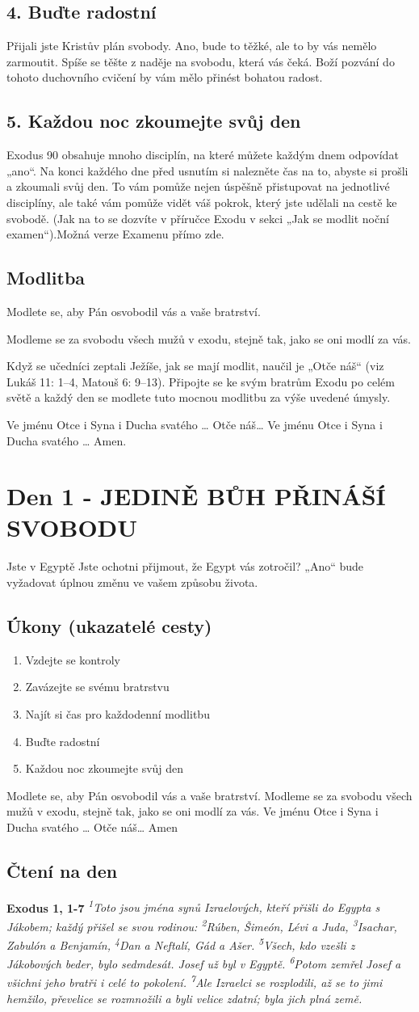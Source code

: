 \documentclass[11pt]{article}
\newcommand{\zacatekPrvniTyden}{
  Jste v Egyptě \newline
  Jste ochotni přijmout, že Egypt vás zotročil? „Ano“ bude vyžadovat úplnou změnu ve vašem způsobu života.

\subsection*{Úkony (ukazatelé cesty)}
\begin{enumerate}
  \item Vzdejte se kontroly
  \item Zavázejte se svému bratrstvu
  \item Najít si čas pro každodenní modlitbu
  \item Buďte radostní
  \item Každou noc zkoumejte svůj den
\end{enumerate}
Modlete se, aby Pán osvobodil vás a vaše bratrství. \newline
Modleme se za svobodu všech mužů v exodu, stejně tak, jako se oni modlí za vás.\newline
Ve jménu Otce i Syna i Ducha svatého …  Otče náš… Amen
}
\begin{document}
\subsection*{4. Buďte radostní}
Přijali jste Kristův plán svobody. Ano, bude to těžké, ale to by vás nemělo zarmoutit. Spíše se těšte z naděje na svobodu, která vás čeká. Boží pozvání do tohoto duchovního cvičení by vám mělo přinést bohatou radost.

\subsection*{5. Každou noc zkoumejte svůj den}
Exodus 90 obsahuje mnoho disciplín, na které můžete každým dnem odpovídat „ano“. Na konci každého dne před usnutím si nalezněte čas na to, abyste si prošli a zkoumali svůj den. To vám pomůže nejen úspěšně přistupovat na jednotlivé disciplíny, ale také vám pomůže vidět váš pokrok, který jste udělali na cestě ke svobodě. (Jak na to se dozvíte v příručce Exodu v sekci „Jak se modlit noční examen“).Možná verze Examenu přímo zde.

\subsection*{Modlitba}
Modlete se, aby Pán osvobodil vás a vaše bratrství.

Modleme se za svobodu všech mužů v exodu, stejně tak, jako se oni modlí za vás.

Když se učedníci zeptali Ježíše, jak se mají modlit, naučil je „Otče náš“ (viz Lukáš 11: 1–4, Matouš 6: 9–13). Připojte se ke svým bratrům Exodu po celém světě a každý den se modlete tuto mocnou modlitbu za výše uvedené úmysly.

Ve jménu Otce i Syna i Ducha svatého …  Otče náš… Ve jménu Otce i Syna i Ducha svatého … Amen.

\newpage
\section{Den 1 - JEDINĚ BŮH PŘINÁŠÍ SVOBODU}
\zacatekPrvniTyden
\subsection*{Čtení na den}
\textbf{Exodus 1, 1-7}
\newline
\textit{
\textsuperscript{1}Toto jsou jména synů Izraelových, kteří přišli do Egypta s Jákobem; každý přišel se svou rodinou:
\textsuperscript{2}Rúben, Šimeón, Lévi a Juda,
\textsuperscript{3}Isachar, Zabulón a Benjamín,
\textsuperscript{4}Dan a Neftalí, Gád a Ašer.
\textsuperscript{5}Všech, kdo vzešli z Jákobových beder, bylo sedmdesát. Josef už byl v Egyptě.
\textsuperscript{6}Potom zemřel Josef a všichni jeho bratři i celé to pokolení.
\textsuperscript{7}Ale Izraelci se rozplodili, až se to jimi hemžilo, převelice se rozmnožili a byli velice zdatní; byla jich plná země.
}
\end{document}
